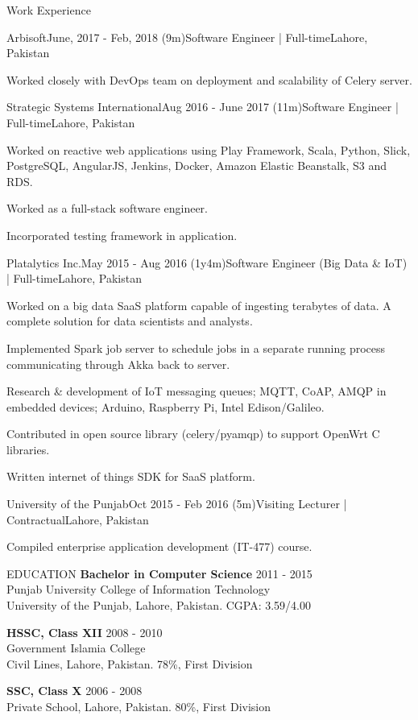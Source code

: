 \documentclass{resume}
\begin{document}
\begin{rSection}{Work Experience}
\begin{rSubsection}{Arbisoft}{June, 2017 - Feb, 2018 (9m)}{Software Engineer | Full-time}{Lahore, Pakistan}
    \item Worked closely with DevOps team on deployment and scalability of Celery server.
  \end{rSubsection}
  \begin{rSubsection}{Strategic Systems International}{Aug 2016 - June 2017 (11m)}{Software Engineer | Full-time}{Lahore, Pakistan}
    \item Worked on reactive web applications using Play Framework, Scala, Python, Slick, PostgreSQL, AngularJS, Jenkins, Docker, Amazon Elastic Beanstalk, S3 and RDS.
    \item Worked as a full-stack software engineer.
    \item Incorporated testing framework in application.
  \end{rSubsection}
  \begin{rSubsection}{Platalytics Inc.}{May 2015 - Aug 2016 (1y4m)}{Software Engineer (Big Data \& IoT) | Full-time}{Lahore, Pakistan}
    \item Worked on a big data SaaS platform capable of ingesting terabytes of data. A complete solution for data scientists and analysts.
    \item Implemented Spark job server to schedule jobs in a separate running process communicating through Akka back to server.
    \item Research \& development of IoT messaging queues; MQTT, CoAP, AMQP in embedded devices; Arduino, Raspberry Pi, Intel Edison/Galileo.
    \item Contributed in open source library (celery/pyamqp) to support OpenWrt C libraries.
    \item Written internet of things SDK for SaaS platform.
  \end{rSubsection}
  \begin{rSubsection}{University of the Punjab}{Oct 2015 - Feb 2016 (5m)}{Visiting Lecturer | Contractual}{Lahore, Pakistan}
    \item Compiled enterprise application development (IT-477) course.
  \end{rSubsection}
\end{rSection}
\begin{rSection}{EDUCATION}
  {\bf Bachelor in Computer Science} \hfill {2011 - 2015}
  \\
  Punjab University College of Information Technology
  \\
  University of the Punjab, Lahore, Pakistan. CGPA: 3.59/4.00

  {\bf HSSC, Class XII} \hfill {2008 - 2010}
  \\
  Government Islamia College
  \\
  Civil Lines, Lahore, Pakistan. 78\%, First Division

    {\bf SSC, Class X}  \hfill {2006 - 2008}
  \\
  Private School, Lahore, Pakistan. 80\%, First Division

\end{rSection}
\end{document}

